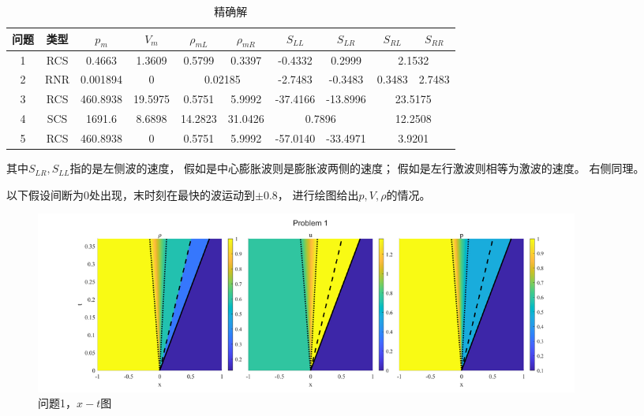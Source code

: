 \documentclass[UTF8,zihao=5]{ctexart} %
\begin{document}
\begin{table}[H]
    \small
    \begin{center}
        \caption{精确解}
        \begin{tabular}{|c|c|c|c|c|c|c|c|c|c|}
            \hline
            问题 & 类型 & $p_m$    & $V_m$   & $\rho_{mL}$                   & ${\rho_{mR}}$ & $S_{LL}$                     & $S_{LR}$                      & $S_{RL}$                      & $S_{RR}$ \\
            \hline
            1    & RCS  & 0.4663   & 1.3609  & 0.5799                        & 0.3397        & -0.4332                      & 0.2999                        & \multicolumn{2}{|c|}{2.1532}             \\
            \hline
            2    & RNR  & 0.001894 & 0       & \multicolumn{2}{|c|}{0.02185} & -2.7483       & -0.3483                      & 0.3483                        & 2.7483                                   \\
            \hline
            3    & RCS  & 460.8938 & 19.5975 & 0.5751                        & 5.9992        & -37.4166                     & -13.8996                      & \multicolumn{2}{|c|}{23.5175}            \\
            \hline
            4    & SCS  & 1691.6   & 8.6898  & 14.2823                       & 31.0426       & \multicolumn{2}{|c|}{0.7896} & \multicolumn{2}{|c|}{12.2508}                                            \\
            \hline
            5    & RCS  & 460.8938 & 0       & 0.5751                        & 5.9992        & -57.0140                     & -33.4971                      & \multicolumn{2}{|c|}{3.9201}             \\
            \hline
        \end{tabular}
    \end{center}
\end{table}

其中$S_{LR},S_{LL}$指的是左侧波的速度，
假如是中心膨胀波则是膨胀波两侧的速度；
假如是左行激波则相等为激波的速度。
右侧同理。

以下假设间断为0处出现，末时刻在最快的波运动到$\pm0.8$，
进行绘图给出$p,V,\rho$的情况。



\begin{figure}[H]
    \centering
    \includegraphics[width=18cm]{p1.png}  %
    \caption{问题1，$x-t$图}
    \label{fig:1a}
\end{figure}
\end{document}
